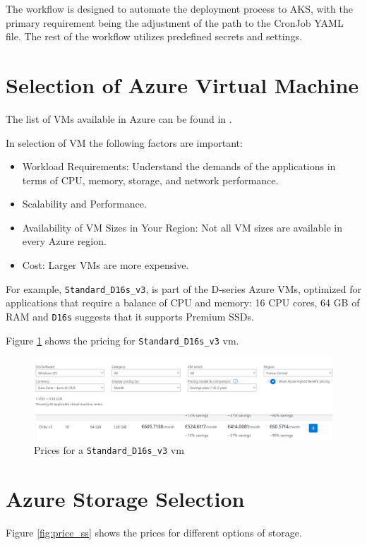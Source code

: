 \documentclass{article}
\begin{document}
The workflow is designed to automate the deployment process to AKS, with the primary requirement being the adjustment of the path to the CronJob YAML file. The rest of the workflow utilizes predefined secrets and settings.

\section{Selection of Azure Virtual Machine} \label{AVM} 

The list of VMs available in Azure can be found in \cite{avm}.

In selection of VM the following factors are important:
\begin{itemize}
\item Workload Requirements: Understand the demands of the applications in terms of CPU, memory, storage, and network performance.
\item Scalability and Performance.
\item Availability of VM Sizes in Your Region: Not all VM sizes are available in every Azure region. 
\item Cost: Larger VMs are more expensive.
\end{itemize}

For example, \texttt{Standard\_D16s\_v3},  is part of the D-series Azure VMs, optimized for applications that require a balance of CPU and memory: 16 CPU cores, 64 GB of RAM and \texttt{D16s} suggests that it supports Premium SSDs.

Figure \ref{fig:price_vm} shows the pricing for \texttt{Standard\_D16s\_v3} vm.

\begin{figure}[H] 
\begin{center}
\includegraphics[scale = .3]{figures/prices_vm.png}
\caption{Prices for a \texttt{Standard\_D16s\_v3} vm}
\label{fig:price_vm}
\end{center}
\end{figure}


\section{Azure Storage Selection} 
Figure \ref{fig:price_ss} shows the prices for different options of storage. 
\end{document}
